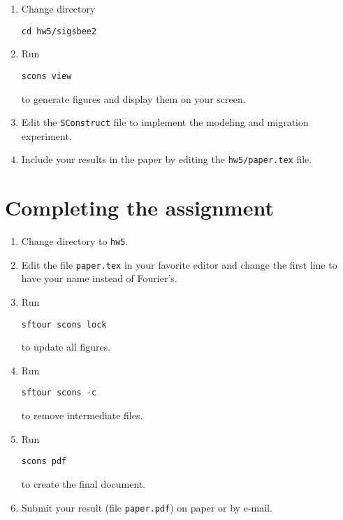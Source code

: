 \begin{enumerate}
    \begin{enumerate}
    \item Change directory 
\begin{verbatim}
cd hw5/sigsbee2
\end{verbatim}
    \item Run
\begin{verbatim}
scons view
\end{verbatim}
      to generate figures and display them on your screen.  
    \item Edit the \texttt{SConstruct} file to implement the modeling and migration experiment.
    \item Include your results in the paper by editing the \texttt{hw5/paper.tex} file.
    \end{enumerate}

\lstset{language=python,numbers=left,numberstyle=\tiny,showstringspaces=false}


\end{enumerate}

\section{Completing the assignment}

\begin{enumerate}
\item Change directory to \texttt{hw5}.
\item Edit the file \texttt{paper.tex} in your favorite editor and change the
  first line to have your name instead of Fourier's.
\item Run
\begin{verbatim}
sftour scons lock
\end{verbatim}
to update all figures.
\item Run
\begin{verbatim}
sftour scons -c
\end{verbatim}
to remove intermediate files.
\item Run
\begin{verbatim} 
scons pdf
\end{verbatim}
to create the final document.
\item Submit your result (file \texttt{paper.pdf}) on paper or by
  e-mail. 
\end{enumerate}

